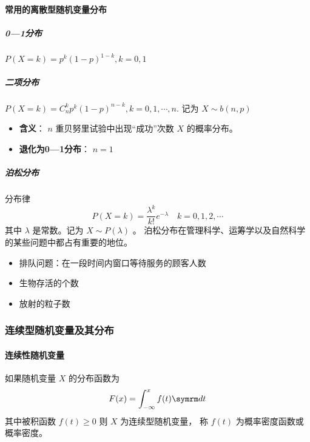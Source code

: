 \paragraph{常用的离散型随机变量分布}

\subparagraph{0—1分布}  $ P(X = k) = p^k(1-p)^{1-k}, k = 0,1 $ 

\subparagraph{二项分布}  $ P(X=k) = C_n^k p^k (1-p)^{n-k}, k = 0,1,\cdots,n. $ 记为 $ X \sim b(n,p) $
\begin{itemize}[leftmargin=\subparitemindent]
    \item \textbf{含义}：   $ n $  重贝努里试验中出现“成功”次数 $ X $ 的概率分布。
    \item \textbf{退化为0—1分布}：  $ n=1 $ 
\end{itemize}

\subparagraph{泊松分布}  分布律  $$ P(X=k) = \frac{\lambda^k}{k!}e^{-\lambda} \quad k = 0,1,2,\cdots $$ 
其中  $ \lambda $ 是常数。记为  $ X \sim P(\lambda) $ 。
泊松分布在管理科学、运筹学以及自然科学的某些问题中都占有重要的地位。 
\begin{itemize}[leftmargin=\subparitemindent]
    \item 排队问题：在一段时间内窗口等待服务的顾客人数
    \item 生物存活的个数
    \item 放射的粒子数
\end{itemize}

\subsubsection{连续型随机变量及其分布}

\paragraph{连续性随机变量} 如果随机变量 $ X $ 的分布函数为
$$ F(x) = \int_{-\infty}^x f(t)\diff t $$ 
其中被积函数 $ f(t) \geqslant 0 $ 则 $ X $ 为连续型随机变量，
称 $ f(t) $ 为概率密度函数或概率密度。

